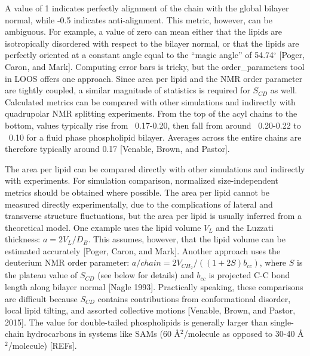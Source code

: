 \documentclass[9pt,bestpractices]{livecoms}
\begin{document}
A value of 1 indicates perfectly alignment of the chain with the global bilayer normal, while -0.5 indicates anti-alignment.
This metric, however, can be ambiguous.
For example, a value of zero can mean either that the lipids are isotropically disordered with respect to the bilayer normal, or that the lipids are perfectly oriented at a constant angle equal to the ``magic angle'' of 54.74$^{\circ}$ [Poger, Caron, and Mark].
Computing error bars is tricky, but the order\_parameters tool in LOOS offers one approach.
Since area per lipid and the NMR order parameter are tightly coupled, a similar magnitude of statistics is required for $S_{CD}$ as well.
Calculated metrics can be compared with other simulations and indirectly with quadrupolar NMR splitting experiments.
From the top of the acyl chains to the bottom, values typically rise from ~0.17-0.20, then fall from around ~0.20-0.22 to ~0.10 for a fluid phase phospholipid bilayer.
Averages across the entire chains are therefore typically around 0.17 [Venable, Brown, and Pastor].

The area per lipid can be compared directly with other simulations and indirectly with experiments.
For simulation comparison, normalized size-independent metrics should be obtained where possible.
The area per lipid cannot be measured directly experimentally, due to the complications of lateral and transverse structure fluctuations, but the area per lipid is usually inferred from a theoretical model.
One example uses the lipid volume $V_L$ and the Luzzati thickness: $a=2V_L/D_B$.
This assumes, however, that the lipid volume can be estimated accurately [Poger, Caron, and Mark].
Another approach uses the deuterium NMR order parameter: $a/chain=2V_{CH_2}/((1+2S)b_{cc})$, where $S$ is the plateau value of $S_{CD}$ (see below for details) and $b_{cc}$ is projected C-C bond length along bilayer normal [Nagle 1993].
Practically speaking, these comparisons are difficult because $S_{CD}$ contains contributions from conformational disorder, local lipid tilting, and assorted collective motions [Venable, Brown, and Pastor, 2015].
The value for double-tailed phospholipids is generally larger than single-chain hydrocarbons in systems like SAMs (60 \AA$^2$/molecule as opposed to 30-40 \AA$^2$/molecule) [REFs].
\end{document}
